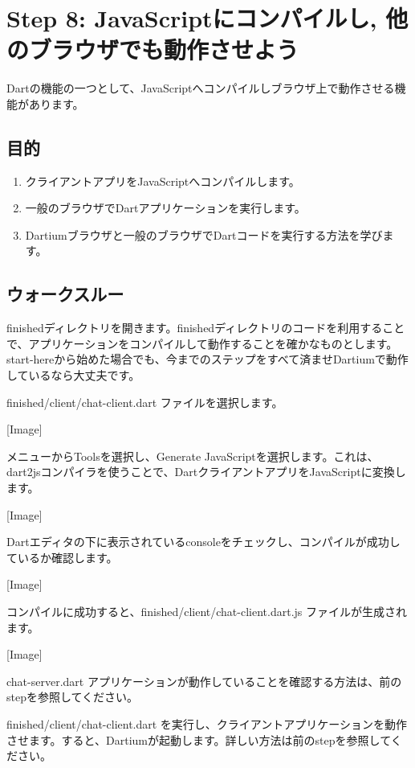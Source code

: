 \section{Step 8: JavaScriptにコンパイルし, 他のブラウザでも動作させよう}

Dartの機能の一つとして、JavaScriptへコンパイルしブラウザ上で動作させる機能があります。

\subsection{目的}

\begin{enumerate}
\item クライアントアプリをJavaScriptへコンパイルします。
\item 一般のブラウザでDartアプリケーションを実行します。
\item Dartiumブラウザと一般のブラウザでDartコードを実行する方法を学びます。
\end{enumerate}

\subsection{ウォークスルー}

finishedディレクトリを開きます。finishedディレクトリのコードを利用することで、アプリケーションをコンパイルして動作することを確かなものとします。start-hereから始めた場合でも、今までのステップをすべて済ませDartiumで動作しているなら大丈夫です。

finished/client/chat-client.dart ファイルを選択します。

[Image]

メニューからToolsを選択し、Generate JavaScriptを選択します。これは、dart2jsコンパイラを使うことで、DartクライアントアプリをJavaScriptに変換します。

[Image]

Dartエディタの下に表示されているconsoleをチェックし、コンパイルが成功しているか確認します。

[Image]

コンパイルに成功すると、finished/client/chat-client.dart.js ファイルが生成されます。

[Image]

chat-server.dart アプリケーションが動作していることを確認する方法は、前のstepを参照してください。

finished/client/chat-client.dart を実行し、クライアントアプリケーションを動作させます。すると、Dartiumが起動します。詳しい方法は前のstepを参照してください。

